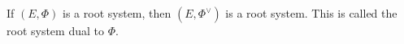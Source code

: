 If $(E, \Phi)$ is a root system, then $(E, \Phi^\vee)$ is a root system. This
is called the root system dual to $\Phi$.

